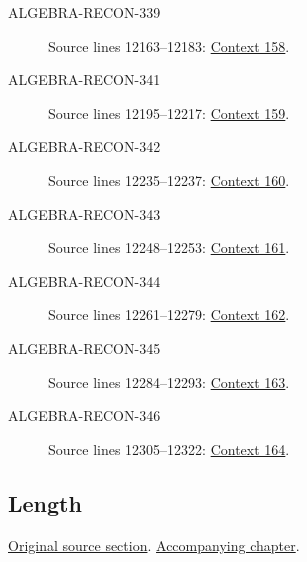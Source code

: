 \begin{description}
\item[ALGEBRA-RECON-339] Source lines 12163--12183: \hyperlink{algebra-context-158}{Context 158}.
\item[ALGEBRA-RECON-341] Source lines 12195--12217: \hyperlink{algebra-context-159}{Context 159}.
\item[ALGEBRA-RECON-342] Source lines 12235--12237: \hyperlink{algebra-context-160}{Context 160}.
\item[ALGEBRA-RECON-343] Source lines 12248--12253: \hyperlink{algebra-context-161}{Context 161}.
\item[ALGEBRA-RECON-344] Source lines 12261--12279: \hyperlink{algebra-context-162}{Context 162}.
\item[ALGEBRA-RECON-345] Source lines 12284--12293: \hyperlink{algebra-context-163}{Context 163}.
\item[ALGEBRA-RECON-346] Source lines 12305--12322: \hyperlink{algebra-context-164}{Context 164}.
\end{description}

\subsection{Length}
\hypertarget{algebra-source-section-length}{}
\noindent\href{https://github.com/stacks/stacks-project/blob/a04446e57ec1fbc252a871afcec7752fb2807b14/algebra.tex\#L12346}{Original source section}. \href{algebra.pdf\#nameddest=section-length}{Accompanying chapter}.

